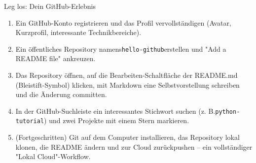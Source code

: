 \begin{tcbpractice}{Leg los: Dein GitHub-Erlebnis}
\begin{enumerate}
  \item Ein GitHub-Konto registrieren und das Profil vervollständigen (Avatar, Kurzprofil, interessante Technikbereiche).
  \item Ein öffentliches Repository namens\texttt{hello-\allowbreak github}erstellen und "Add a README file" ankreuzen.
  \item Das Repository öffnen, auf die Bearbeiten-Schaltfläche der README.md (Bleistift-Symbol) klicken, mit Markdown eine Selbstvorstellung schreiben und die Änderung committen.
  \item In der GitHub-Suchleiste ein interessantes Stichwort suchen (z. B.\texttt{python-\allowbreak tutorial}) und zwei Projekte mit einem Stern markieren.
  \item (Fortgeschritten) Git auf dem Computer installieren, das Repository lokal klonen, die README ändern und zur Cloud zurückpushen – ein vollständiger "Lokal Cloud"-Workflow.
\end{enumerate}

\end{tcbpractice}
